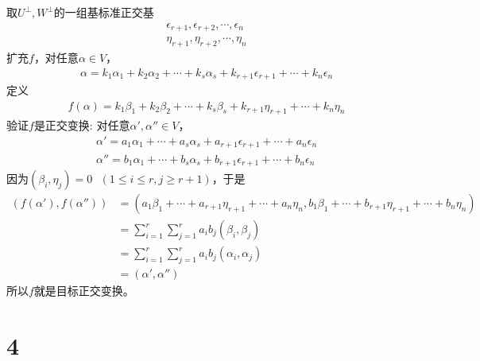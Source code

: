 \documentclass{article}
\begin{document}
\begin{itemize}
        取$U^{\bot}, W^{\bot}$的一组基标准正交基
        \begin{align*}
          \epsilon_{r + 1}, \epsilon_{r + 2}, \cdots, \epsilon_{n} \\
          \eta_{r + 1}, \eta_{r + 2}, \cdots, \eta_{n}
        \end{align*}
        扩充$f$，对任意$\alpha \in V$，
        \begin{align*}
          \alpha = k_1 \alpha_1 + k_2 \alpha_2 + \cdots + k_s \alpha_s + k_{r + 1} \epsilon_{r + 1} + \cdots + k_n \epsilon_n
        \end{align*}
        定义
        \begin{align*}
          f(\alpha) = k_1 \beta_1 + k_2 \beta_2 + \cdots + k_s \beta_s + k_{r + 1} \eta_{r + 1} + \cdots + k_n \eta_n
        \end{align*}
        验证$f$是正交变换:
        对任意$\alpha', \alpha'' \in V$，
        \begin{align*}
          \alpha' = a_1 \alpha_1 + \cdots + a_s \alpha_s + a_{r + 1} \epsilon_{r + 1} + \cdots + a_n \epsilon_n \\
          \alpha'' = b_1 \alpha_1 + \cdots + b_s \alpha_s + b_{r + 1} \epsilon_{r + 1} + \cdots + b_n \epsilon_n
        \end{align*}
        因为$(\beta_i, \eta_j) = 0 \ \ \ (1 \leq i \leq r, j \geq r + 1)$，于是
        \begin{align*}
          (f(\alpha'), f(\alpha''))
           & = (a_1 \beta_1 + \cdots + a_{r + 1} \eta_{r + 1} + \cdots + a_n \eta_n, b_1 \beta_1 + \cdots + b_{r + 1} \eta_{r + 1} + \cdots + b_n \eta_n) \\
           & = \sum\limits_{i = 1}^r \sum\limits_{j = 1}^r a_i b_j (\beta_i, \beta_j)                                                                     \\
           & = \sum\limits_{i = 1}^r \sum\limits_{j = 1}^r a_i b_j (\alpha_i, \alpha_j)                                                                   \\
           & = (\alpha', \alpha'')
        \end{align*}
        所以$f$就是目标正交变换。
\end{itemize}

\section*{4}
\end{document}
